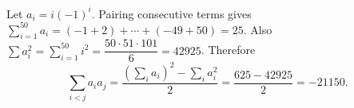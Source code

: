 Let $a_i=i(-1)^i$. Pairing consecutive terms gives $\sum_{i=1}^{50}a_i=(-1+2)+\cdots+(-49+50)=25$. Also $\sum a_i^2=\sum_{i=1}^{50}i^2=\dfrac{50\cdot51\cdot101}{6}=42925$. Therefore
\[\sum_{i<j}a_ia_j=\dfrac{(\sum_i a_i)^2-\sum_i a_i^2}{2}
=\dfrac{625-42925}{2}=\boxed{-21150}.\]
